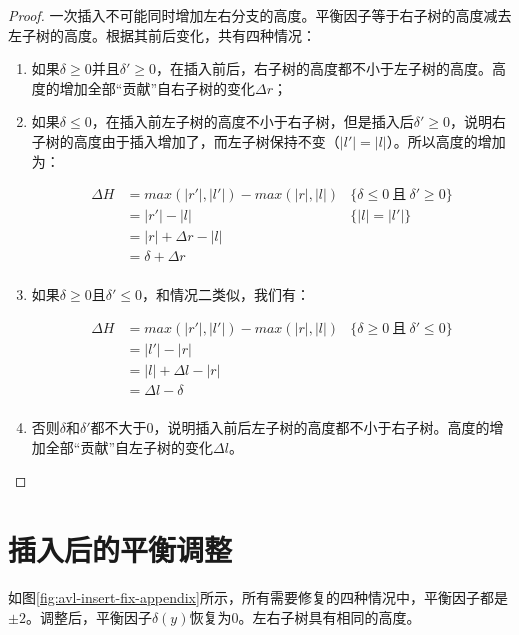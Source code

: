 \documentclass[b5paper]{ctexart}
\begin{document}
\begin{proof}
一次插入不可能同时增加左右分支的高度。平衡因子等于右子树的高度减去左子树的高度。根据其前后变化，共有四种情况：

\begin{enumerate}
\item 如果$\delta \geq 0$并且$\delta' \geq 0$，在插入前后，右子树的高度都不小于左子树的高度。高度的增加全部“贡献”自右子树的变化$\Delta r$；

\item 如果$\delta \leq 0$，在插入前左子树的高度不小于右子树，但是插入后$\delta' \geq 0$，说明右子树的高度由于插入增加了，而左子树保持不变（$|l'|=|l|$）。所以高度的增加为：

\[
\begin{array}{rll}
\Delta H & = max(|r'|, |l'|) - max (|r|, |l|) & \{\delta \leq 0\ \text{且}\ \delta' \geq 0 \}\\
         & = |r'|-|l| & \{|l|=|l'|\}\\
         & = |r|+\Delta r - |l| & \\
         & = \delta + \Delta r & \\
\end{array}
\]

\item 如果$\delta \geq 0$且$\delta' \leq 0$，和情况二类似，我们有：

\[
\begin{array}{rll}
\Delta H & = max(|r'|, |l'|) - max (|r|, |l|) & \{\delta \geq 0\ \text{且}\ \delta' \leq 0 \}\\
         & = |l'|-|r| & \\
         & = |l| + \Delta l - |r| & \\
         & = \Delta l - \delta & \\
\end{array}
\]

\item 否则$\delta$和$\delta'$都不大于0，说明插入前后左子树的高度都不小于右子树。高度的增加全部“贡献”自左子树的变化$\Delta l$。
\end{enumerate}

\end{proof}

\section{插入后的平衡调整}

如图\ref{fig:avl-insert-fix-appendix}所示，所有需要修复的四种情况中，平衡因子都是$\pm 2$。调整后，平衡因子$\delta(y)$恢复为0。左右子树具有相同的高度。
\end{document}
